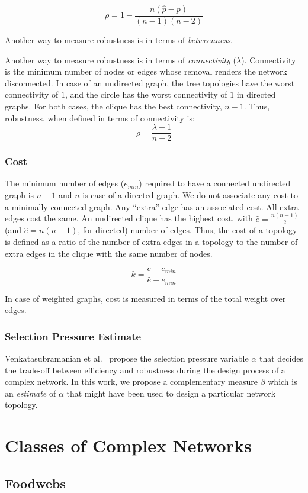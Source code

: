 \documentclass[twocolumn,showpacs,preprintnumbers,amsmath,amssymb]{revtex4}
\begin{document}
\[\rho = 1 - \frac{n(\hat{p} - \bar{p})}{(n - 1)(n - 2)}\]

Another way to measure robustness is in terms of \textit{betweenness}. 

Another way to measure robustness is in terms of \textit{connectivity} ($\lambda$). Connectivity is the minimum number of nodes or edges whose removal renders the network disconnected. In case of an undirected graph, the tree topologies have the worst connectivity of $1$, and the circle has the worst connectivity of $1$ in directed graphs. For both cases, the clique has the best connectivity, $n - 1$. Thus, robustness, when defined in terms of connectivity is:
\[\rho = \frac{\lambda - 1}{n - 2}\]

\subsubsection{Cost}
The minimum number of edges ($e_{min}$) required to have a connected undirected graph is $n - 1$ and $n$ is case of a directed graph. We do not associate any cost to a minimally connected graph. Any ``extra'' edge has an associated cost. All extra edges cost the same. An undirected clique has the highest cost, with $\hat{e} = \frac{n(n - 1)}{2}$ (and $\hat{e} = n(n - 1)$, for directed) number of edges. Thus, the cost of a topology is defined as a ratio of the number of extra edges in a topology to the number of extra edges in the clique with the same number of nodes.

\[ k = \frac{e - e_{min}} {\hat{e} - e_{min}} \]

In case of weighted graphs, cost is measured in terms of the total weight over edges.

\subsubsection{Selection Pressure Estimate}
Venkatasubramanian et al.~\cite{venkat04} propose the selection pressure variable $\alpha$ that decides the trade-off between efficiency and robustness during the design process of a complex network. In this work, we propose a complementary measure $\beta$ which is an \textit{estimate} of $\alpha$ that might have been used to design a particular network topology.

\section{Classes of Complex Networks}
\subsection{Foodwebs}
\end{document}
